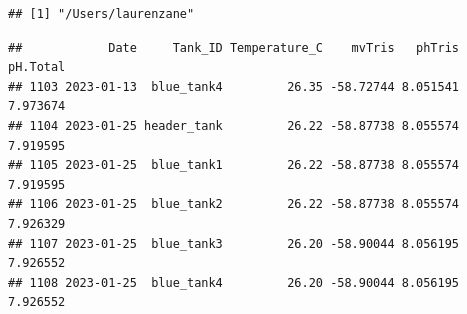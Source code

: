 \documentclass[
]{article}
\newenvironment{Shaded}{\begin{snugshade}}{\end{snugshade}}
\newcommand{\CommentTok}[1]{\textcolor[rgb]{0.56,0.35,0.01}{\textit{#1}}}
\newcommand{\FunctionTok}[1]{\textcolor[rgb]{0.00,0.00,0.00}{#1}}
\newcommand{\NormalTok}[1]{#1}
\newcommand{\OtherTok}[1]{\textcolor[rgb]{0.56,0.35,0.01}{#1}}
\newcommand{\SpecialCharTok}[1]{\textcolor[rgb]{0.00,0.00,0.00}{#1}}
\newcommand{\StringTok}[1]{\textcolor[rgb]{0.31,0.60,0.02}{#1}}
\begin{document}
\begin{verbatim}
## [1] "/Users/laurenzane"
\end{verbatim}

\begin{Shaded}
\end{Shaded}

\begin{verbatim}
##            Date     Tank_ID Temperature_C    mvTris   phTris pH.Total
## 1103 2023-01-13  blue_tank4         26.35 -58.72744 8.051541 7.973674
## 1104 2023-01-25 header_tank         26.22 -58.87738 8.055574 7.919595
## 1105 2023-01-25  blue_tank1         26.22 -58.87738 8.055574 7.919595
## 1106 2023-01-25  blue_tank2         26.22 -58.87738 8.055574 7.926329
## 1107 2023-01-25  blue_tank3         26.20 -58.90044 8.056195 7.926552
## 1108 2023-01-25  blue_tank4         26.20 -58.90044 8.056195 7.926552
\end{verbatim}

\begin{Shaded}
\end{Shaded}
\end{document}
